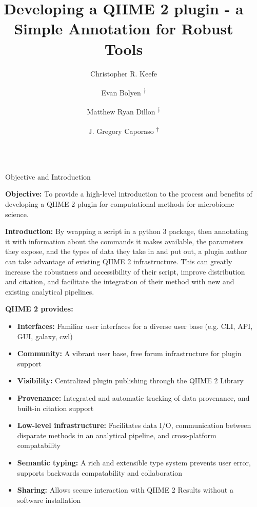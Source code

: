 \documentclass[final]{beamer}
\title{Developing a QIIME 2 plugin - a Simple Annotation for Robust Tools}
\author{Christopher R. Keefe \and Evan Bolyen \textsuperscript{†} \and Matthew Ryan Dillon \textsuperscript{†} \and J. Gregory Caporaso \textsuperscript{†} }
\institute[shortinst]{The Pathogen and Microbiome Institute at Northern Arizona University \\
{\footnotesize \textsuperscript{†} Advisors} }
\newlength{\sepwidth}
\newlength{\colwidth}
\newcommand{\separatorcolumn}{\begin{column}{\sepwidth}\end{column}}
\begin{document}
\begin{frame}[t]
\begin{columns}[t]
\separatorcolumn

\begin{column}{\colwidth}

  \begin{block}{Objective and Introduction}

    \textbf{Objective:} To provide a high-level introduction to the process and
     benefits of developing a  QIIME 2 \cite{10.7287/peerj.preprints.27295v1}
     plugin for computational methods for microbiome science.
    \hfill\break

    \textbf{Introduction:} By wrapping a script in a python 3 package, then
    annotating it with information about the commands it makes available, the
    parameters they expose, and the types of data they take in and put out, a
    plugin author can take advantage of existing QIIME 2 infrastructure. This
    can greatly increase the robustness and accessibility of their script,
    improve distribution and citation, and facilitate the integration of
    their method with new and existing analytical pipelines.
    \hfill\break

    \textbf{QIIME 2 provides:}
    \begin{itemize}
      \item \textbf{Interfaces:} Familiar user interfaces for a diverse
      user base (e.g. CLI, API, GUI, galaxy, cwl)
      \item \textbf{Community:} A vibrant user base, free forum infrastructure for
      plugin support
      \item \textbf{Visibility:} Centralized plugin publishing through the QIIME 2
      Library
      \item \textbf{Provenance:} Integrated and automatic tracking of data provenance,
      and built-in citation support
      \item \textbf{Low-level infrastructure:} Facilitates data I/O, communication
      between disparate methods in an analytical pipeline, and cross-platform compatability
      \item \textbf{Semantic typing:} A rich and extensible type system prevents user
      error, supports backwards compatability and collaboration
      \item \textbf{Sharing:} Allows secure interaction with QIIME 2 Results
       without a software installation
    \end{itemize}
  \end{block}


\end{column}
\end{columns}
\end{frame}
\end{document}

